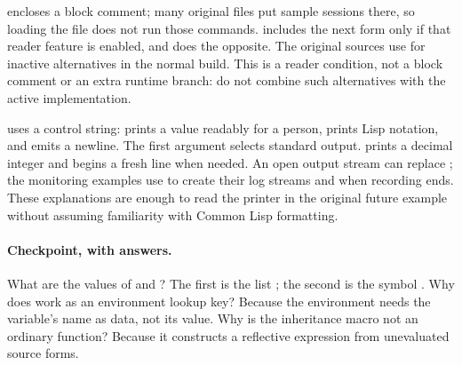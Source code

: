  encloses a block comment; many original files put
sample sessions there, so loading the file does not run those commands.
 includes the next form only if that reader feature is
enabled, and  does the opposite. The original sources
use  for inactive alternatives in the normal build.
This is a reader condition, not a block comment or an extra runtime
branch: do not combine such alternatives with the active implementation.

 uses a control string:  prints a value readably
for a person,  prints Lisp notation, and \code{\~{}\%} emits
a newline. The first argument  selects standard output.
 prints a decimal integer and \code{\~{}\&} begins a fresh
line when needed. An open output stream can replace ; the
monitoring examples use  to create their log streams and
 when recording ends.
These explanations are enough to read the printer in the original
future example without assuming familiarity with Common Lisp formatting.

\paragraph{Checkpoint, with answers.}
What are the values of  and ?
The first is the list ; the second is the symbol .
Why does  work as an environment lookup key?
Because the environment needs the variable's name as data, not its value.
Why is the inheritance macro not an ordinary function?
Because it constructs a reflective expression from unevaluated source forms.
